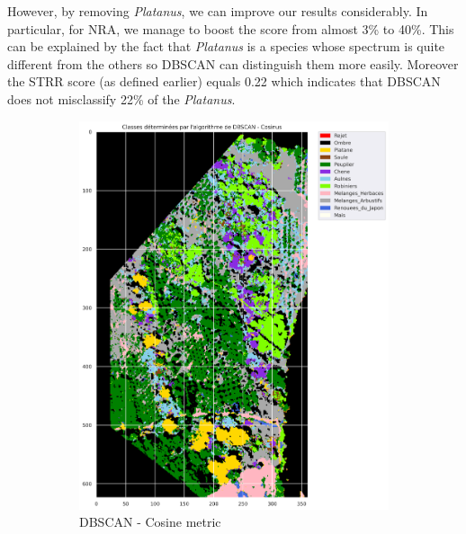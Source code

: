 \documentclass{siamart171218}
\begin{document}
However, by removing \textit{Platanus}, we can improve our results considerably. In particular, for NRA, we manage to boost the score from almost 3\% to 40\%. This can be explained by the fact that \textit{Platanus} is a species whose spectrum is quite different from the others so DBSCAN can distinguish them more easily. Moreover the STRR score (as defined earlier) equals 0.22 which indicates that DBSCAN does not  misclassify 22\% of the \textit{Platanus}. 

\begin{figure}[h!]
        \begin{subfigure}[b]{0.33\textwidth}
                \centering
                \includegraphics[width=0.9\linewidth]{images/Classes_clustering_cosine.png}
                \caption{DBSCAN - Cosine metric}
                \label{DBSCAN_cosine}
        \end{subfigure}%
        \begin{subfigure}[b]{0.33\textwidth}
                \centering

\end{subfigure}
\end{figure}
\end{document}
